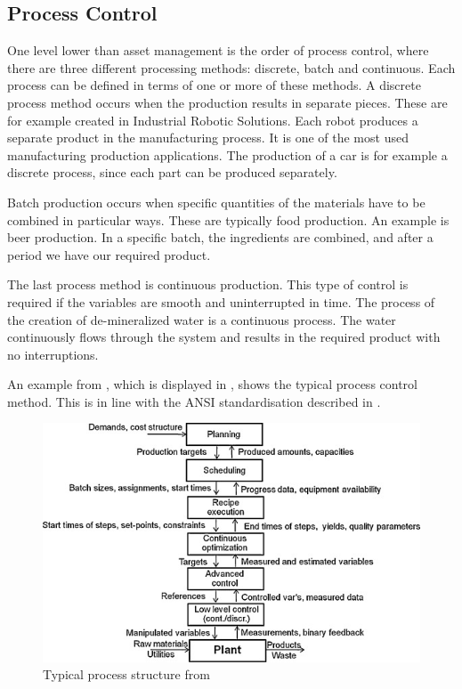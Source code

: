 	
\subsection{Process Control}
One level lower than asset management is the order of process control, where there are three different processing methods: discrete, batch and continuous. Each process can be defined in terms of one or more of these methods. A discrete process method occurs when the production results in separate pieces. These are for example created in Industrial Robotic Solutions. Each robot produces a separate product in the manufacturing process. It is one of the most used manufacturing production applications. The production of a car is for example a discrete process, since each part can be produced separately.

Batch production occurs when specific quantities of the materials have to be combined in particular ways. These are typically food production. An example is beer production. In a specific batch, the ingredients are combined, and after a period we have our required product.

The last process method is continuous production. This type of control is required if the variables are smooth and uninterrupted in time. The process of the creation of de-mineralized water is a continuous process. The water continuously flows through the system and results in the required product with no interruptions.

An example from \citet{engell2012optimal}, which is displayed in , shows the typical process control method. This is in line with the ANSI standardisation described in .

\begin{figure}[h]
\centering
\includegraphics[width=0.7\linewidth]{img/process_structure}
\caption{Typical process structure from \citep{engell2012optimal}}
\label{fig:processstructure}
\end{figure}

